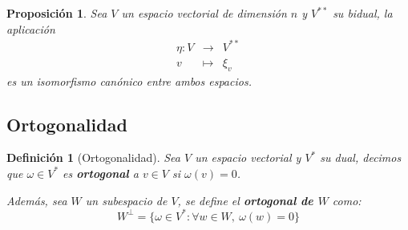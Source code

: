 \documentclass[10pt,a4paper,openright]{book}
\theoremstyle{break}
\newtheorem*{defi}{Definición}
\newtheorem*{prop}{Proposición}
\begin{document}
\begin{prop}
Sea $V$ un espacio vectorial de dimensión $n$ y $V^{**}$ su bidual, la aplicación
\begin{eqnarray*}
\eta: V &\longrightarrow& V^{**} \\ v &\longmapsto& \xi_v
\end{eqnarray*}
es un isomorfismo canónico entre ambos espacios.
\end{prop}

\subsection{Ortogonalidad}

\begin{defi}[Ortogonalidad]
Sea $V$ un espacio vectorial y $V^*$ su dual, decimos que $\omega \in V^*$ es \textbf{ortogonal} a $v\in V$ si $\omega(v)=0$.

Además, sea $W$ un subespacio de $V$, se define el \textbf{ortogonal de $W$} como:
$$W^\perp=\{\omega \in V^*:\forall w \in W, \ \omega(w)=0\}$$
\end{defi}
\end{document}
